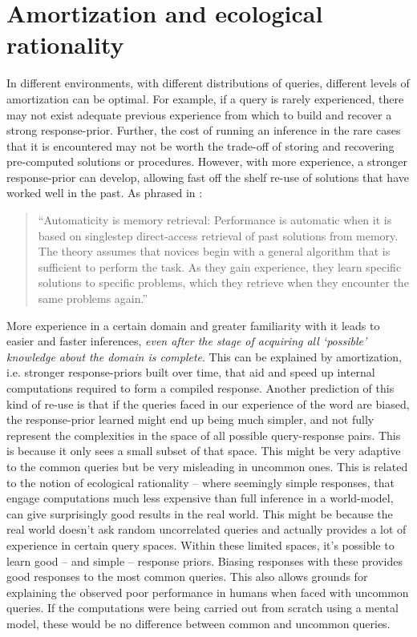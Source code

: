 \section{Amortization and ecological rationality}

In different environments, with different distributions of queries, different levels of amortization can be optimal. For example, if a query is rarely experienced, there may not exist adequate previous experience from which to build and recover a strong response-prior. Further, the cost of running an inference in the rare cases that it is encountered may not be worth the trade-off of storing and recovering pre-computed solutions or procedures. However, with more experience, a stronger response-prior can develop, allowing fast off the shelf re-use of solutions that have worked well in the past. As phrased in \cite{logan1988toward}:
\begin{quote}
``Automaticity is memory retrieval: Performance is automatic when it is based on singlestep direct-access retrieval of past solutions from memory. The theory assumes that novices begin with a general algorithm that is sufficient to perform the task. As they gain experience, they learn specific solutions to specific problems, which they retrieve when they encounter the same problems again.''
\end{quote}

More experience in a certain domain and greater familiarity with it leads to easier and faster inferences, \textit{even after the stage of acquiring all `possible' knowledge about the domain is complete}. This can be explained by amortization, i.e. stronger response-priors built over time, that aid and speed up internal computations required to form a compiled response. Another prediction of this kind of re-use is that if the queries faced in our experience of the word are biased, the response-prior learned might end up being much simpler, and not fully represent the complexities in the space of all possible query-response pairs. This is because it only sees a small subset of that space. This might be very adaptive to the common queries but be very misleading in uncommon ones. This is related to the notion of ecological rationality -- where seemingly simple responses, that engage computations much less expensive than full inference in a world-model, can give surprisingly good results in the real world. This might be because the real world doesn't ask random uncorrelated queries and actually provides a lot of experience in certain query spaces. Within these limited spaces, it's possible to learn good -- and simple -- response priors. Biasing responses with these provides good responses to the most common queries. This also allows grounds for explaining the observed poor performance in humans when faced with uncommon queries. If the computations were being carried out from scratch using a mental model, these would be no difference between common and uncommon queries.


